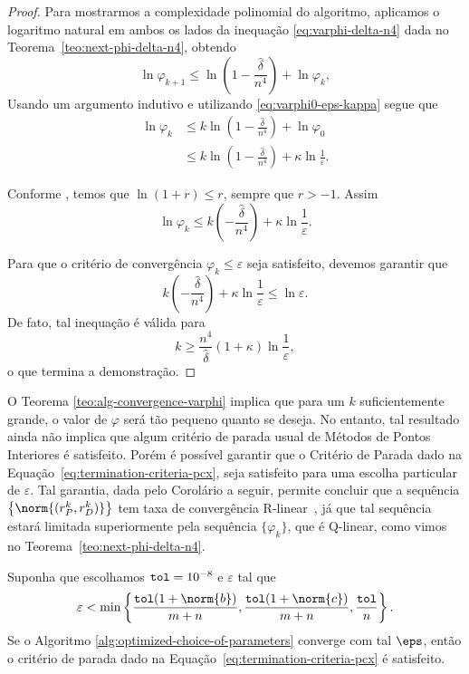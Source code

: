 \begin{proof} Para mostrarmos a complexidade polinomial do algoritmo, aplicamos o logaritmo natural em ambos os lados da inequação \eqref{eq:varphi-delta-n4} dada no Teorema~\ref{teo:next-phi-delta-n4}, obtendo
	\[
	\ln\varphi_{k+1}\leq \ln \left(1 - \frac{\hat{\delta}}{n^{4}}\right) + \ln\varphi_{k},
	\]
Usando um argumento indutivo e utilizando \eqref{eq:varphi0-eps-kappa} segue que
\[
	\begin{aligned}
		\ln\varphi_{k} & \leq k \ln\left(1 - \frac{\hat{\delta}}{n^{4}}\right) + \ln \varphi_{0} \\
					& \leq k \ln\left(1 - \frac{\hat{\delta}}{n^{4}}\right) + \kappa\ln \frac{1}{\varepsilon}. 
	\end{aligned}
\] 

Conforme \textcite[Lema 4.1, p.~68]{Wright:Primal-dual-interior-point:1997h}, temos que $\ln(1+r) \leq r$, sempre que $r>-1$. Assim
\[
	\ln\varphi_{k}\leq k \left(- \frac{\hat{\delta}}{n^{4}}\right) + \kappa\ln \frac{1}{\varepsilon}.
\] 

Para que o critério de convergência $\varphi_{k}\leq\varepsilon$ seja satisfeito, devemos garantir que 
\[
	k \left(- \frac{\hat{\delta}}{n^{4}}\right) + \kappa\ln \frac{1}{\varepsilon} \leq \ln\varepsilon.
\] 
De fato, tal inequação é válida para 
\[
	k \geq \dfrac{n^{4}}{\hat{\delta}}(1+\kappa)\ln\frac{1}{\varepsilon},
\]
o que termina a demonstração.
\end{proof}






O Teorema \ref{teo:alg-convergence-varphi} implica que para um $k$ suficientemente grande, o valor de $\varphi$ será tão pequeno quanto se deseja. No entanto, tal resultado ainda não implica que algum critério de parada usual de Métodos de Pontos Interiores é satisfeito. Porém é possível garantir que o Critério de Parada dado na Equação~\eqref{eq:termination-criteria-pcx}, seja satisfeito para uma escolha particular de $\varepsilon$. Tal garantia, dada pelo Corolário a seguir, permite concluir que a sequência $\left\{\norm{(r_{P}^{k},r_{D}^{k})}\right\}$ tem taxa de convergência R-linear~\cite{Ortega:2000vd}, já que tal sequência estará limitada superiormente pela sequência $\{\varphi_{k}\}$, que é Q-linear, como vimos no Teorema~\ref{teo:next-phi-delta-n4}.

\begin{corol}
Suponha que escolhamos  $\mathtt{tol} = \num{e-8}$  e $\varepsilon$   tal que 
\begin{equation}
	\label{eq:choosing-eps}
		\varepsilon < \min\left\{  \frac{\tol(1+\norm{b})}{m+n}, \frac{\tol(1+\norm{c})}{m+n},\frac{\tol}{n}\right\}.
\end{equation}
Se o Algoritmo \ref{alg:optimized-choice-of-parameters} converge com tal $\eps$, então o critério de parada dado na Equação~\eqref{eq:termination-criteria-pcx} é satisfeito.
\end{corol}		

